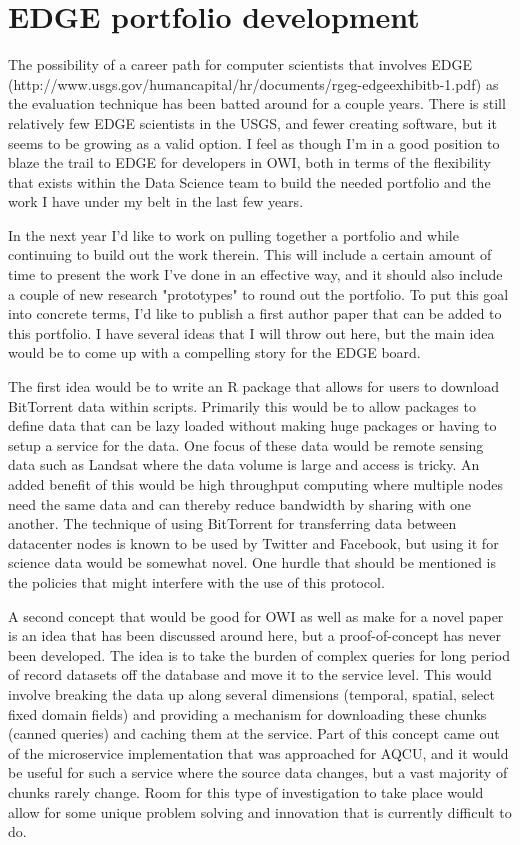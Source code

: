 \documentclass{article}
\begin{document}
\section{EDGE portfolio development}

The possibility of a career path for computer scientists that involves EDGE (http://www.usgs.gov/humancapital/hr/documents/rgeg-edgeexhibitb-1.pdf) as the evaluation technique has been batted around for a couple years.
There is still relatively few EDGE scientists in the USGS, and fewer creating software, but it seems to be growing as a valid option.
I feel as though I'm in a good position to blaze the trail to EDGE for developers in OWI, both in terms of the flexibility that exists within the Data Science team to build the needed portfolio and the work I have under my belt in the last few years.

In the next year I'd like to work on pulling together a portfolio and while continuing to build out the work therein.
This will include a certain amount of time to present the work I've done in an effective way, and it should also include a couple of new research "prototypes" to round out the portfolio.
To put this goal into concrete terms, I'd like to publish a first author paper that can be added to this portfolio.
I have several ideas that I will throw out here, but the main idea would be to come up with a compelling story for the EDGE board.

The first idea would be to write an R package that allows for users to download BitTorrent data within scripts.
Primarily this would be to allow packages to define data that can be lazy loaded without making huge packages or having to setup a service for the data.
One focus of these data would be remote sensing data such as Landsat where the data volume is large and access is tricky.
An added benefit of this would be high throughput computing where multiple nodes need the same data and can thereby reduce bandwidth by sharing with one another.
The technique of using BitTorrent for transferring data between datacenter nodes is known to be used by Twitter and Facebook, but using it for science data would be somewhat novel.
One hurdle that should be mentioned is the policies that might interfere with the use of this protocol.

A second concept that would be good for OWI as well as make for a novel paper is an idea that has been discussed around here, but a proof-of-concept has never been developed.
The idea is to take the burden of complex queries for long period of record datasets off the database and move it to the service level.
This would involve breaking the data up along several dimensions (temporal, spatial, select fixed domain fields) and providing a mechanism for downloading these chunks (canned queries) and caching them at the service.
Part of this concept came out of the microservice implementation that was approached for AQCU, and it would be useful for such a service where the source data changes, but a vast majority of chunks rarely change.
Room for this type of investigation to take place would allow for some unique problem solving and innovation that is currently difficult to do.
\end{document}
